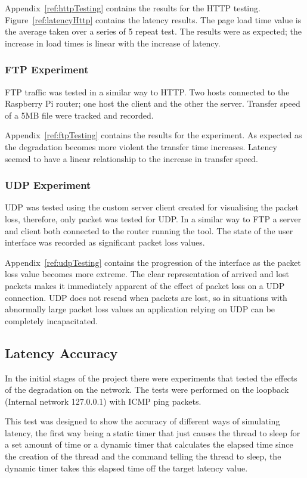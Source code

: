Appendix~\ref{ref:httpTesting} contains the results for the HTTP testing. Figure~\ref{ref:latencyHttp} contains the latency results. The page load time value is the average taken over a series of 5 repeat test. The results were as expected; the increase in load times is linear with the increase of latency.


\subsubsection{FTP Experiment}
FTP traffic was tested in a similar way to HTTP. Two hosts connected to the Raspberry Pi router; one host the client and the other the server. Transfer speed of a 5MB file were tracked and recorded.

Appendix~\ref{ref:ftpTesting} contains the results for the experiment. As expected as the degradation becomes more violent the transfer time increases. Latency seemed to have a linear relationship to the increase in transfer speed.

\subsubsection{UDP Experiment}
UDP was tested using the custom server client created for visualising the packet loss, therefore, only packet was tested for UDP. In a similar way to FTP a server and client both connected to the router running the tool. The state of the user interface was recorded as significant packet loss values.

Appendix~\ref{ref:udpTesting} contains the progression of the interface as the packet loss value becomes more extreme. The clear representation of arrived and lost packets makes it immediately apparent of the effect of packet loss on a UDP connection. UDP does not resend when packets are lost, so in situations with abnormally large packet loss values an application relying on UDP can be completely incapacitated.

\subsection{Latency Accuracy}
In the initial stages of the project there were experiments that tested the effects of the degradation on the network. The tests were performed on the loopback (Internal network 127.0.0.1) with ICMP ping packets.

This test was designed to show the accuracy of different ways of simulating latency, the first way being a static timer that just causes the thread to sleep for a set amount of time or a dynamic timer that calculates the elapsed time since the creation of the thread and the command telling the thread to sleep, the dynamic timer takes this elapsed time off the target latency value.

